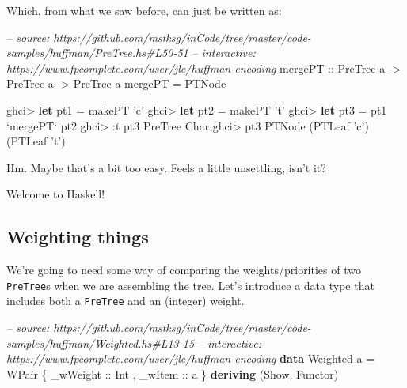 \documentclass[]{article}
\newenvironment{Shaded}{\begin{snugshade}}{\end{snugshade}}
\newcommand{\CharTok}[1]{\textcolor[rgb]{0.31,0.60,0.02}{#1}}
\newcommand{\CommentTok}[1]{\textcolor[rgb]{0.56,0.35,0.01}{\textit{#1}}}
\newcommand{\DataTypeTok}[1]{\textcolor[rgb]{0.13,0.29,0.53}{#1}}
\newcommand{\FunctionTok}[1]{\textcolor[rgb]{0.00,0.00,0.00}{#1}}
\newcommand{\KeywordTok}[1]{\textcolor[rgb]{0.13,0.29,0.53}{\textbf{#1}}}
\newcommand{\NormalTok}[1]{#1}
\newcommand{\OtherTok}[1]{\textcolor[rgb]{0.56,0.35,0.01}{#1}}
\begin{document}
Which, from what we saw before, can just be written as:

\begin{Shaded}
\begin{Highlighting}[]
\CommentTok{-- source: https://github.com/mstksg/inCode/tree/master/code-samples/huffman/PreTree.hs#L50-51}
\CommentTok{-- interactive: https://www.fpcomplete.com/user/jle/huffman-encoding}
\OtherTok{mergePT ::} \DataTypeTok{PreTree}\NormalTok{ a }\OtherTok{->} \DataTypeTok{PreTree}\NormalTok{ a }\OtherTok{->} \DataTypeTok{PreTree}\NormalTok{ a}
\NormalTok{mergePT }\FunctionTok{=} \DataTypeTok{PTNode}
\end{Highlighting}
\end{Shaded}

\begin{Shaded}
\begin{Highlighting}[]
\NormalTok{ghci}\FunctionTok{>} \KeywordTok{let}\NormalTok{ pt1 }\FunctionTok{=}\NormalTok{ makePT }\CharTok{'c'}
\NormalTok{ghci}\FunctionTok{>} \KeywordTok{let}\NormalTok{ pt2 }\FunctionTok{=}\NormalTok{ makePT }\CharTok{'t'}
\NormalTok{ghci}\FunctionTok{>} \KeywordTok{let}\NormalTok{ pt3 }\FunctionTok{=}\NormalTok{ pt1 }\OtherTok{`mergePT`}\NormalTok{ pt2}
\NormalTok{ghci}\FunctionTok{>} \FunctionTok{:}\NormalTok{t pt3}
\DataTypeTok{PreTree} \DataTypeTok{Char}
\NormalTok{ghci}\FunctionTok{>}\NormalTok{ pt3}
\DataTypeTok{PTNode}\NormalTok{ (}\DataTypeTok{PTLeaf} \CharTok{'c'}\NormalTok{) (}\DataTypeTok{PTLeaf} \CharTok{'t'}\NormalTok{)}
\end{Highlighting}
\end{Shaded}

Hm. Maybe that's a bit too easy. Feels a little unsettling, isn't it?

Welcome to Haskell!

\hypertarget{weighting-things}{%
\subsection{Weighting things}\label{weighting-things}}

We're going to need some way of comparing the weights/priorities of two
\texttt{PreTree}s when we are assembling the tree. Let's introduce a data type
that includes both a \texttt{PreTree} and an (integer) weight.

\begin{Shaded}
\begin{Highlighting}[]
\CommentTok{-- source: https://github.com/mstksg/inCode/tree/master/code-samples/huffman/Weighted.hs#L13-15}
\CommentTok{-- interactive: https://www.fpcomplete.com/user/jle/huffman-encoding}
\KeywordTok{data} \DataTypeTok{Weighted}\NormalTok{ a }\FunctionTok{=} \DataTypeTok{WPair}\NormalTok{ \{}\OtherTok{ _wWeight ::} \DataTypeTok{Int}
\NormalTok{                        ,}\OtherTok{ _wItem   ::}\NormalTok{ a}
\NormalTok{                        \} }\KeywordTok{deriving}\NormalTok{ (}\DataTypeTok{Show}\NormalTok{, }\DataTypeTok{Functor}\NormalTok{)}
\end{Highlighting}
\end{Shaded}
\end{document}
